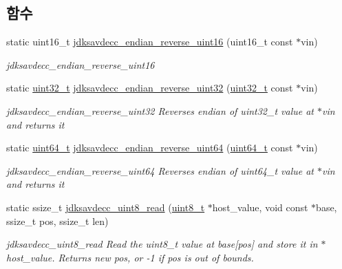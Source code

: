 \subsection*{함수}
\begin{DoxyCompactItemize}
\item 
static uint16\+\_\+t \hyperlink{group__endian_gaa2ad482647dffc2d32cda7f953630063}{jdksavdecc\+\_\+endian\+\_\+reverse\+\_\+uint16} (uint16\+\_\+t const $\ast$vin)
\begin{DoxyCompactList}\small\item\em jdksavdecc\+\_\+endian\+\_\+reverse\+\_\+uint16 \end{DoxyCompactList}\item 
static \hyperlink{parse_8c_a6eb1e68cc391dd753bc8ce896dbb8315}{uint32\+\_\+t} \hyperlink{group__endian_gadc02e23d74b1e541c4e725d690113709}{jdksavdecc\+\_\+endian\+\_\+reverse\+\_\+uint32} (\hyperlink{parse_8c_a6eb1e68cc391dd753bc8ce896dbb8315}{uint32\+\_\+t} const $\ast$vin)
\begin{DoxyCompactList}\small\item\em jdksavdecc\+\_\+endian\+\_\+reverse\+\_\+uint32 Reverses endian of uint32\+\_\+t value at $\ast$vin and returns it \end{DoxyCompactList}\item 
static \hyperlink{parse_8c_aec6fcb673ff035718c238c8c9d544c47}{uint64\+\_\+t} \hyperlink{group__endian_gadab3d8d317465b0224a3532b892f9590}{jdksavdecc\+\_\+endian\+\_\+reverse\+\_\+uint64} (\hyperlink{parse_8c_aec6fcb673ff035718c238c8c9d544c47}{uint64\+\_\+t} const $\ast$vin)
\begin{DoxyCompactList}\small\item\em jdksavdecc\+\_\+endian\+\_\+reverse\+\_\+uint64 Reverses endian of uint64\+\_\+t value at $\ast$vin and returns it \end{DoxyCompactList}\item 
static ssize\+\_\+t \hyperlink{group__endian_ga25eac79531675b56aaa5d7870d880b33}{jdksavdecc\+\_\+uint8\+\_\+read} (\hyperlink{stdint_8h_aba7bc1797add20fe3efdf37ced1182c5}{uint8\+\_\+t} $\ast$host\+\_\+value, void const $\ast$base, ssize\+\_\+t pos, ssize\+\_\+t len)
\begin{DoxyCompactList}\small\item\em jdksavdecc\+\_\+uint8\+\_\+read Read the uint8\+\_\+t value at base\mbox{[}pos\mbox{]} and store it in $\ast$host\+\_\+value. Returns new pos, or -\/1 if pos is out of bounds. \end{DoxyCompactList}\item 

\end{DoxyCompactItemize}
